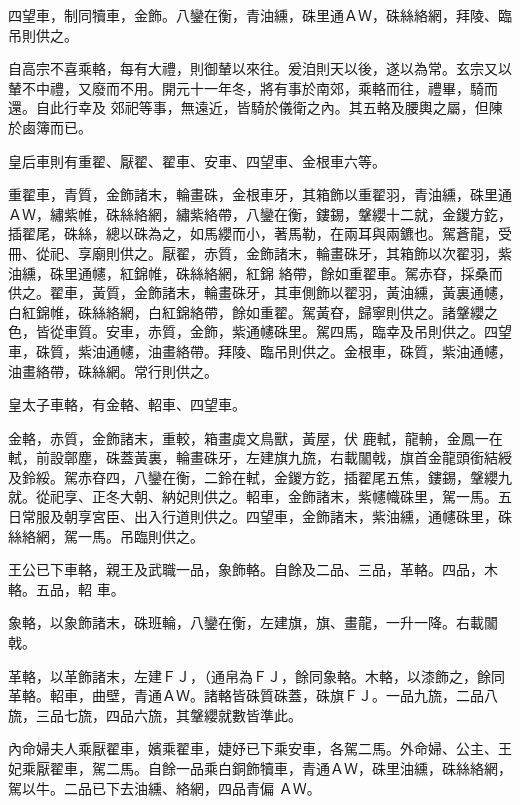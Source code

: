 \begin{pinyinscope}
 四望車，制同犢車，金飾。八鑾在衡，青油纁，硃里通ＡＷ，硃絲絡網，拜陵、臨吊則供之。



 自高宗不喜乘輅，每有大禮，則御輦以來往。爰洎則天以後，遂以為常。玄宗又以輦不中禮，又廢而不用。開元十一年冬，將有事於南郊，乘輅而往，禮畢，騎而還。自此行幸及
 郊祀等事，無遠近，皆騎於儀衛之內。其五輅及腰輿之屬，但陳於鹵簿而已。



 皇后車則有重翟、厭翟、翟車、安車、四望車、金根車六等。



 重翟車，青質，金飾諸末，輪畫硃，金根車牙，其箱飾以重翟羽，青油纁，硃里通ＡＷ，繡紫帷，硃絲絡網，繡紫絡帶，八鑾在衡，鏤錫，鞶纓十二就，金鍐方釳，插翟尾，硃絲，總以硃為之，如馬纓而小，著馬勒，在兩耳與兩鑣也。駕蒼龍，受冊、從祀、享廟則供之。厭翟，赤質，金飾諸末，輪畫硃牙，其箱飾以次翟羽，紫油纁，硃里通幰，紅錦帷，硃絲絡網，紅錦
 絡帶，餘如重翟車。駕赤昚，採桑而供之。翟車，黃質，金飾諸末，輪畫硃牙，其車側飾以翟羽，黃油纁，黃裏通幰，白紅錦帷，硃絲絡網，白紅錦絡帶，餘如重翟。駕黃昚，歸寧則供之。諸鞶纓之色，皆從車質。安車，赤質，金飾，紫通幰硃里。駕四馬，臨幸及吊則供之。四望車，硃質，紫油通幰，油畫絡帶。拜陵、臨吊則供之。金根車，硃質，紫油通幰，油畫絡帶，硃絲網。常行則供之。



 皇太子車輅，有金輅、軺車、四望車。



 金輅，赤質，金飾諸末，重較，箱畫虡文鳥獸，黃屋，伏
 鹿軾，龍輈，金鳳一在軾，前設鄣塵，硃蓋黃裏，輪畫硃牙，左建旗九旒，右載闟戟，旗首金龍頭銜結綬及鈴綏。駕赤昚四，八鑾在衡，二鈴在軾，金鍐方釳，插翟尾五焦，鏤錫，鞶纓九就。從祀享、正冬大朝、納妃則供之。軺車，金飾諸末，紫幰幟硃里，駕一馬。五日常服及朝享宮臣、出入行道則供之。四望車，金飾諸末，紫油纁，通幰硃里，硃絲絡網，駕一馬。吊臨則供之。



 王公已下車輅，親王及武職一品，象飾輅。自餘及二品、三品，革輅。四品，木輅。五品，軺
 車。



 象輅，以象飾諸末，硃班輪，八鑾在衡，左建旗，旗、畫龍，一升一降。右載闟戟。



 革輅，以革飾諸末，左建ＦＪ，（通帛為ＦＪ，餘同象輅。木輅，以漆飾之，餘同革輅。軺車，曲壁，青通ＡＷ。諸輅皆硃質硃蓋，硃旗ＦＪ。一品九旒，二品八旒，三品七旒，四品六旒，其鞶纓就數皆準此。



 內命婦夫人乘厭翟車，嬪乘翟車，婕妤已下乘安車，各駕二馬。外命婦、公主、王妃乘厭翟車，駕二馬。自餘一品乘白銅飾犢車，青通ＡＷ，硃里油纁，硃絲絡網，駕以牛。二品已下去油纁、絡網，四品青偏
 ＡＷ。




\end{pinyinscope}
